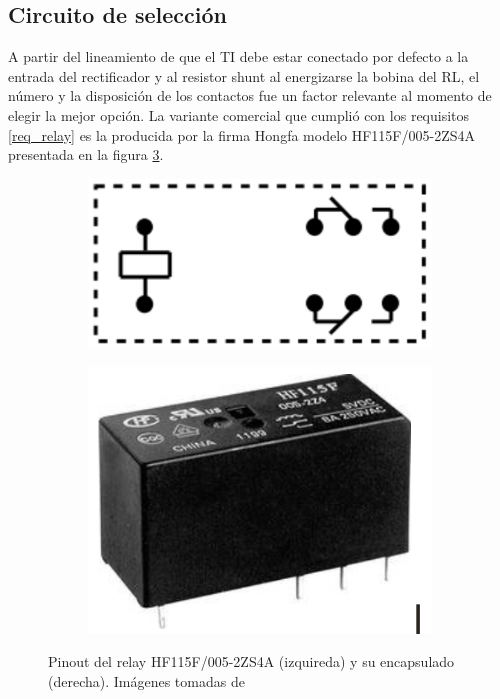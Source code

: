 \subsection{Circuito de selección}
A partir del lineamiento de que el TI debe estar conectado por defecto a la entrada del rectificador y al resistor shunt al energizarse la bobina del RL, el número y la disposición de los contactos fue un factor relevante al momento de elegir la mejor opción. La variante comercial que cumplió con los requisitos \ref{req_relay} es la producida por la firma Hongfa modelo HF115F/005-2ZS4A presentada en la figura \ref{fig:relay}.
\begin{figure}[h!]
    \centering
	\begin{subfigure}[b]{0.3\textwidth}
		\centering
		\includegraphics[width=.65\textwidth]{./Figures/relay_pinout}
		\caption{}
		\label{fig:relay_pinout}
	\end{subfigure}
    \centering
	\begin{subfigure}[b]{0.3\textwidth}
		\centering
		\includegraphics[width=.65\textwidth]{./Figures/relay_encapsulado}
		\caption{}
		\label{fig:relay_encapsulado}
	\end{subfigure}
	\caption{Pinout del relay HF115F/005-2ZS4A (izquireda) y su encapsulado (derecha). Imágenes tomadas de \citep{datasheet_relay}}
	\label{fig:relay}
\end{figure}

